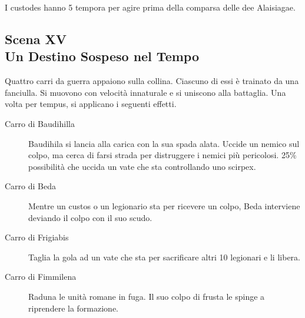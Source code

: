 \documentclass[11.5pt,twocolumn]{article}
\begin{document}

I custodes hanno 5 tempora per agire prima della comparsa delle dee Alaisiagae.

\subsection*{Scena XV\\Un Destino Sospeso nel Tempo}
%
Quattro carri da guerra appaiono sulla collina.
Ciascuno di essi \`{e} trainato da una fanciulla.
Si muovono con velocit\`{a} innaturale e si uniscono alla battaglia.
Una volta per tempus, si applicano i seguenti effetti.
\begin{description}
\item[Carro di Baudihilla] Baudihila si lancia alla carica con la sua spada alata. Uccide un nemico sul colpo, ma cerca di farsi strada per distruggere i nemici pi\`{u} pericolosi. 25\% possibilit\`{a} che uccida un vate che sta controllando uno scirpex.
\item[Carro di Beda] Mentre un custos o un legionario sta per ricevere un colpo, Beda interviene deviando il colpo con il suo scudo.
\item[Carro di Frigiabis] Taglia la gola ad un vate che sta per sacrificare altri 10 legionari e li libera.
\item[Carro di Fimmilena] Raduna le unit\`{a} romane in fuga. Il suo colpo di frusta le spinge a riprendere la formazione.
\end{description}
\end{document}
